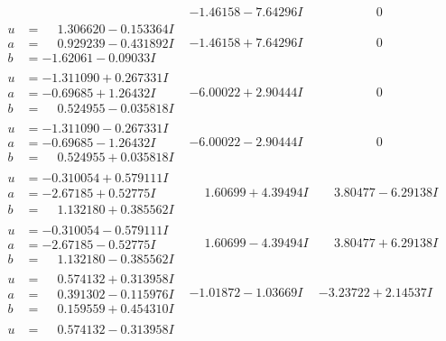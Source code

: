 \documentclass[1p]{elsarticle_modified}
\theoremstyle{definition}
\begin{document}
$$\begin{array}{c|c|c}
 & -1.46158 - 7.64296 I & \phantom{-0.000000 } 0 \\ \hline\begin{aligned}
u &= \phantom{-}1.306620 - 0.153364 I \\
a &= \phantom{-}0.929239 - 0.431892 I \\
b &= -1.62061 - 0.09033 I\end{aligned}
 & -1.46158 + 7.64296 I & \phantom{-0.000000 } 0 \\ \hline\begin{aligned}
u &= -1.311090 + 0.267331 I \\
a &= -0.69685 + 1.26432 I \\
b &= \phantom{-}0.524955 - 0.035818 I\end{aligned}
 & -6.00022 + 2.90444 I & \phantom{-0.000000 } 0 \\ \hline\begin{aligned}
u &= -1.311090 - 0.267331 I \\
a &= -0.69685 - 1.26432 I \\
b &= \phantom{-}0.524955 + 0.035818 I\end{aligned}
 & -6.00022 - 2.90444 I & \phantom{-0.000000 } 0 \\ \hline\begin{aligned}
u &= -0.310054 + 0.579111 I \\
a &= -2.67185 + 0.52775 I \\
b &= \phantom{-}1.132180 + 0.385562 I\end{aligned}
 & \phantom{-}1.60699 + 4.39494 I & \phantom{-}3.80477 - 6.29138 I \\ \hline\begin{aligned}
u &= -0.310054 - 0.579111 I \\
a &= -2.67185 - 0.52775 I \\
b &= \phantom{-}1.132180 - 0.385562 I\end{aligned}
 & \phantom{-}1.60699 - 4.39494 I & \phantom{-}3.80477 + 6.29138 I \\ \hline\begin{aligned}
u &= \phantom{-}0.574132 + 0.313958 I \\
a &= \phantom{-}0.391302 - 0.115976 I \\
b &= \phantom{-}0.159559 + 0.454310 I\end{aligned}
 & -1.01872 - 1.03669 I & -3.23722 + 2.14537 I \\ \hline\begin{aligned}
u &= \phantom{-}0.574132 - 0.313958 I \\

\end{aligned}
\end{array}$$
\end{document}
